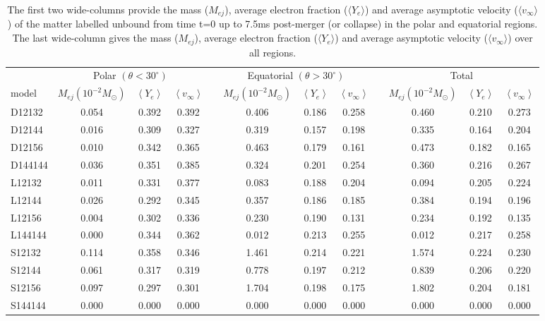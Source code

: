 \begin{table*}
\begin{adjustbox}{width={\textwidth},totalheight={\textheight},keepaspectratio}
\begin{tabular}{lccccccccccc}\toprule
& \multicolumn{3}{c}{Polar $(\theta < 30^\circ)$} & \phantom{abc}& \multicolumn{3}{c}{Equatorial $(\theta > 30^\circ)$} &
  \phantom{abc} & \multicolumn{3}{c}{Total}\\ \cmidrule{2-4}
\cmidrule{6-8} \cmidrule{10-12}
  model\quad\quad\quad\quad &  $M_{ej} (10^{-2}M_\odot)$ & $\left<Y_e\right>$ & $\left<v_\infty\right>$ && $M_{ej} (10^{-2}M_\odot)$ & $\left<Y_e\right>$ & $\left<v_\infty\right>$ && $M_{ej} (10^{-2}M_\odot)$ & $\left<Y_e\right>$ & $\left<v_\infty\right>$\\ \midrule
D12132 & 0.054 & 0.392 & 0.392 && 0.406 & 0.186 & 0.258 && 0.460 & 0.210 & 0.273\\
D12144 & 0.016 & 0.309 & 0.327 && 0.319 & 0.157 & 0.198 && 0.335 & 0.164 & 0.204\\
D12156 & 0.010 & 0.342 & 0.365 && 0.463 & 0.179 & 0.161 && 0.473 & 0.182 & 0.165\\
D144144 & 0.036 & 0.351 & 0.385 && 0.324 & 0.201 & 0.254 && 0.360 & 0.216 & 0.267\\
\midrule
L12132 & 0.011 & 0.331 & 0.377 && 0.083 & 0.188 & 0.204 && 0.094 & 0.205 & 0.224\\
L12144 & 0.026 & 0.292 & 0.345 && 0.357 & 0.186 & 0.185 && 0.384 & 0.194 & 0.196\\
L12156 & 0.004 & 0.302 & 0.336 && 0.230 & 0.190 & 0.131 && 0.234 & 0.192 & 0.135\\
L144144 & 0.000 & 0.344 & 0.362 && 0.012 & 0.213 & 0.255 && 0.012 & 0.217 & 0.258\\
\midrule
S12132 & 0.114 & 0.358 & 0.346 && 1.461 & 0.214 & 0.221 && 1.574 & 0.224 & 0.230\\
S12144 & 0.061 & 0.317 & 0.319 && 0.778 & 0.197 & 0.212 && 0.839 & 0.206 & 0.220\\
S12156 & 0.097 & 0.297 & 0.301 && 1.704 & 0.198 & 0.175 && 1.802 & 0.204 & 0.181\\
S144144 & 0.000 & 0.000 & 0.000 && 0.000 & 0.000 & 0.000 && 0.000 & 0.000 & 0.000\\
\bottomrule
\end{tabular}
\end{adjustbox}
\caption{The first two wide-columns provide the mass ($M_{ej}$), average electron fraction ($\langle Y_e \rangle$) and average asymptotic velocity ($\langle v_\infty \rangle$) of the matter labelled unbound from time t=0 up to 7.5ms post-merger (or collapse) in the polar and equatorial regions. The last wide-column gives the mass ($M_{ej}$), average electron fraction ($\langle Y_e \rangle$) and average asymptotic velocity ($\langle v_\infty \rangle$) over all regions.}
\label{tab:matter_ejecta_props}
\end{table*}

